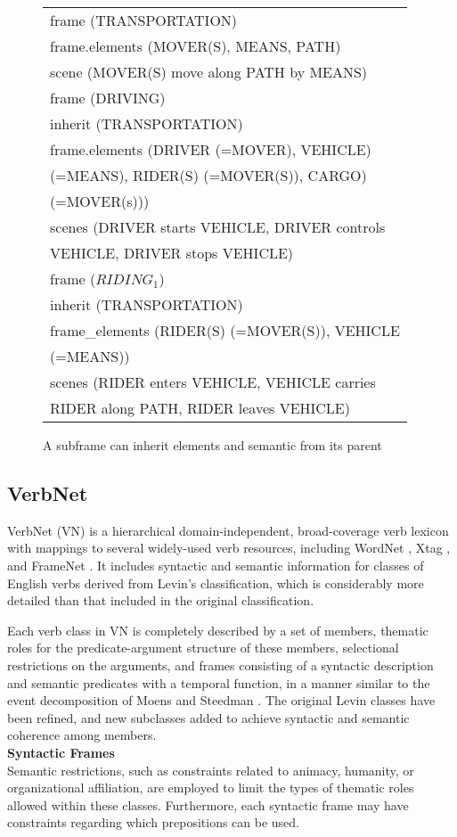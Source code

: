 \begin{figure}
\begingroup
\footnotesize
\centering
\begin{tabularx}{8cm}{l}
\hline
frame (TRANSPORTATION) \\
frame.elements (MOVER(S), MEANS, PATH)\\
scene (MOVER(S) move along PATH by MEANS)\\
\hline
frame (DRIVING)\\
inherit (TRANSPORTATION)\\
frame.elements (DRIVER (=MOVER), VEHICLE)\\
(=MEANS), RIDER(S) (=MOVER(S)), CARGO)\\
(=MOVER(s)))\\
scenes (DRIVER starts VEHICLE, DRIVER controls\\
VEHICLE, DRIVER stops VEHICLE)\\
\hline
frame ($RIDING_1$)\\
inherit (TRANSPORTATION)\\
frame\_elements (RIDER(S) (=MOVER(S)), VEHICLE\\
 (=MEANS))\\
scenes (RIDER enters VEHICLE, VEHICLE carries\\
 RIDER along PATH, RIDER leaves VEHICLE)\\
\hline
\end{tabularx}
\begin{TableCaption}
\caption{A subframe can inherit elements and semantic from its parent  \cite{baker1998berkeley}}\label{tb:framenet}
\end{TableCaption}
\endgroup
\end{figure}
\subsection{VerbNet} \label{verbnet}
VerbNet (VN) is a hierarchical domain-independent, broad-coverage verb lexicon with mappings to several widely-used verb resources, including WordNet \cite{miller1995wordnet}, Xtag \cite{prolo2002generating}, and FrameNet \cite{baker1998berkeley}. It includes syntactic and semantic information for classes of English verbs derived from Levin’s classification, which is considerably more detailed than that included in the original classification. 

Each verb class in VN is completely described by a set of members, thematic roles for the predicate-argument structure of these members, selectional restrictions on the arguments, and frames consisting of a syntactic description and semantic predicates with a temporal function, in a manner similar to the event decomposition of Moens and Steedman \cite{moens2005temporal}. The original Levin classes have been refined, and new subclasses added to achieve syntactic and semantic coherence among members. \\
\textbf{Syntactic Frames} \\ 
Semantic restrictions, such as constraints related to animacy, humanity, or organizational affiliation, are employed to limit the types of thematic roles allowed within these classes. Furthermore, each syntactic frame may have constraints regarding which prepositions can be used. 

